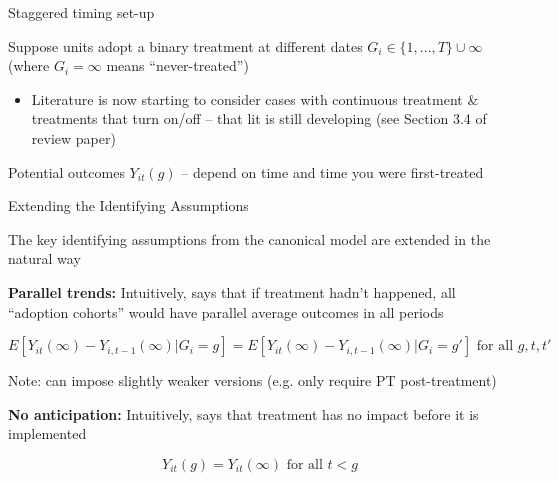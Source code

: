 \documentclass[usenames, dvipsnames, aspectratio = 169, 13pt]{beamer}
\newenvironment{wideitemize}{\itemize\addtolength{\itemsep}{10pt}}{\enditemize}
\begin{document}
\begin{frame}{Staggered timing set-up}
    \begin{wideitemize}

        \item
        Suppose units adopt a binary treatment at different dates $G_i \in \{1,...,T \} \cup \infty$ (where $G_i = \infty$ means ``never-treated'') 
            \begin{itemize}
                \item 
                Literature is now starting to consider cases with continuous treatment \& treatments that turn on/off -- that lit is still developing (see Section 3.4 of review paper)
            \end{itemize}
        
        \item
        Potential outcomes $Y_{it}(g)$ -- depend on time and time you were first-treated
        
    \end{wideitemize}
\end{frame}


\begin{frame}{Extending the Identifying Assumptions}
    \begin{wideitemize}
        \item
        The key identifying assumptions from the canonical model are extended in the natural way
        
        \item
        \textbf{Parallel trends:} Intuitively, says that if treatment hadn't happened, all ``adoption cohorts'' would have parallel average outcomes in all periods
        
        $$ E[ Y_{it}(\infty) - Y_{i,t-1}(\infty) | G_i = g ] = E[ Y_{it}(\infty) - Y_{i,t-1}(\infty) | G_i = g' ] \text{ for all } g,t,t' $$ 
        
        
        Note: can impose slightly weaker versions (e.g. only require PT post-treatment)
        
        \item
        \textbf{No anticipation:} Intuitively, says that treatment has no impact before it is implemented
        
        $$Y_{it}(g) = Y_{it}(\infty) \text{ for all } t<g$$
    \end{wideitemize}
\end{frame}
\end{document}
